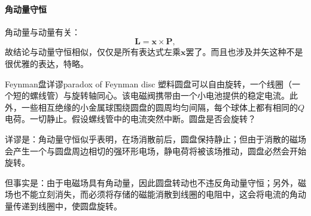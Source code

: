 \paragraph{角动量守恒}
角动量与动量有关：
\[
    \bm L=\bm x\times\bm P,
\]
故结论与动量守恒相似，仅仅是所有表达式左乘$\bm x$罢了。而且也涉及并矢这种不是很优雅的表达，特略。
\begin{example}{Feynman盘详谬}{paradox of Feynman disc}
    塑料圆盘可以自由旋转，一个线圈（一个短的螺线管）与旋转轴同心。该电磁阀携带由一个小电池提供的稳定电流。此外，一些相互绝缘的小金属球围绕圆盘的圆周均匀间隔，每个球体上都有相同的$Q$电荷。一切静止。假设螺线管中的电流突然中断。圆盘是否会旋转？

    详谬是：角动量守恒似乎表明，在场消散前后，圆盘保持静止；但由于消散的磁场会产生一个与圆盘周边相切的强环形电场，静电荷将被该场推动，圆盘必然会开始旋转。

    但事实是：由于电磁场具有角动量，因此圆盘转动也不违反角动量守恒；另外，磁场也不能立刻消失，而必须将存储的磁能消散到线圈的电阻中，这会将电流的角动量传递到线圈中，使圆盘旋转。
\end{example}
